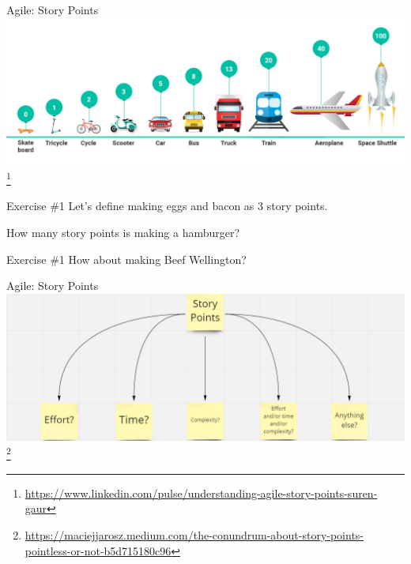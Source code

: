 \documentclass[aspectratio=169]{beamer}
\begin{document}
\begin{frame}{Agile: Story Points}
    \centering
    \includegraphics[width=\textwidth,height=0.8\textheight,keepaspectratio]{agile_story_points.jpg} \footnote{\url{https://www.linkedin.com/pulse/understanding-agile-story-points-suren-gaur}}
\end{frame}
\begin{frame}{Exercise \#1}
    Let's define making eggs and bacon as 3 story points.

    How many story points is making a hamburger?
\end{frame}
\begin{frame}{Exercise \#1}
    How about making Beef Wellington?
\end{frame}
\begin{frame}{Agile: Story Points}
    \centering
    \includegraphics[width=\textwidth,height=0.8\textheight,keepaspectratio]{story_points_meaningless.png} \footnote{\url{https://maciejjarosz.medium.com/the-conundrum-about-story-points-pointless-or-not-b5d715180c96}}
\end{frame}
\end{document}
